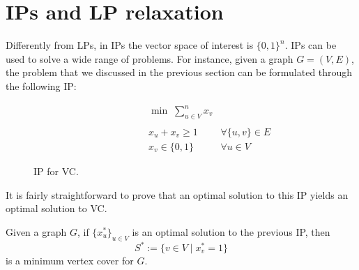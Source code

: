 \documentclass[a4paper, 12pt]{report}
\begin{document}
    \section{IPs and LP relaxation}

    Differently from LPs, in IPs the vector space of interest is $\{0, 1\}^n$. IPs can be used to solve a wide range of problems. For instance, given a graph $G =(V, E)$, the  problem that we discussed in the previous section can be formulated through the following IP:

    \begin{figure}[H]
        \centering
        \[\begin{array}{ccl}
            \qquad\qquad\quad
            & \min \; \displaystyle \sum_{u \in V}^n {x_v} \\\\
            & x_u + x_v \ge 1 & \forall \{u, v\} \in E \\
            & x_v \in \{0,1\} & \forall u \in V
        \end{array}\]
        \caption{IP for VC.}
    \end{figure}

    It is fairly straightforward to prove that an optimal solution to this IP yields an optimal solution to VC.

    \begin{framedlem}[label={vc ip}]{}
        Given a graph $G$, if $\{x^*_u\}_{u \in V}$ is an optimal solution to the previous IP, then $$S^* := \{v \in V \mid x^*_v = 1\}$$ is a minimum vertex cover for $G$.
    \end{framedlem}
\end{document}
